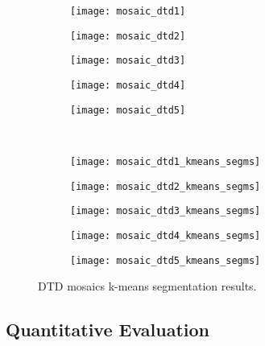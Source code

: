 \begin{figure}[!ht]
    \centering
    \begin{subfigure}[b]{0.19\textwidth}
        \texttt{[image: mosaic\_dtd1]}
    \end{subfigure} 
    \begin{subfigure}[b]{0.19\textwidth}
    	\texttt{[image: mosaic\_dtd2]}
    \end{subfigure}     
    \begin{subfigure}[b]{0.19\textwidth}
        \texttt{[image: mosaic\_dtd3]}
    \end{subfigure}
    \begin{subfigure}[b]{0.19\textwidth}
    	\texttt{[image: mosaic\_dtd4]}
    \end{subfigure}    
    \begin{subfigure}[b]{0.19\textwidth}
        \texttt{[image: mosaic\_dtd5]}
    \end{subfigure} \\ [2ex]
    
    \begin{subfigure}[b]{0.19\textwidth}
    	\texttt{[image: mosaic\_dtd1\_kmeans\_segms]}
        \caption{}
    \end{subfigure}     
    \begin{subfigure}[b]{0.19\textwidth}
        \texttt{[image: mosaic\_dtd2\_kmeans\_segms]}
        \caption{}
    \end{subfigure} 
    \begin{subfigure}[b]{0.19\textwidth}
    	\texttt{[image: mosaic\_dtd3\_kmeans\_segms]}
        \caption{}
    \end{subfigure}     
    \begin{subfigure}[b]{0.19\textwidth}
        \texttt{[image: mosaic\_dtd4\_kmeans\_segms]}
        \caption{}
    \end{subfigure}
    \begin{subfigure}[b]{0.19\textwidth}
    	\texttt{[image: mosaic\_dtd5\_kmeans\_segms]}
        \caption{}
    \end{subfigure} 
        	    
    \caption{DTD mosaics k-means segmentation results.}\label{fig:kmeans_segms_dtd_mosaics}    
\end{figure}


\subsection{Quantitative Evaluation}\label{subsec:quantitative_evaluation}

